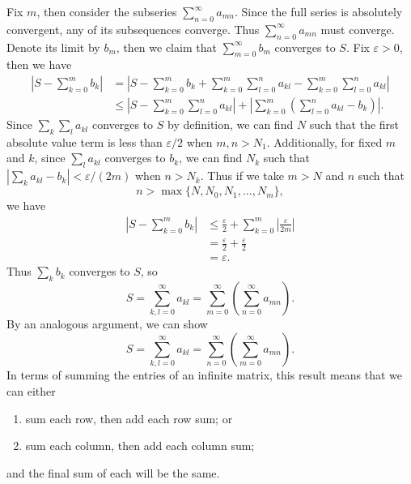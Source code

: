 \documentclass[10pt]{amsart}
\begin{document}
Fix $m$, then consider the subseries $\sum_{n=0}^{\infty} a_{mn}$. Since the full series is absolutely convergent, any of its subsequences converge. Thus $\sum_{n=0}^{\infty} a_{mn}$ must converge. Denote its limit by $b_m$, then we claim that $\sum_{m=0}^{\infty} b_m$ converges to $S$. Fix $\varepsilon>0$, then we have
\begin{align*}
	\left|S-\sum_{k=0}^{m} b_k\right| &= \left| S - \sum_{k=0}^{m} b_k + \sum_{k=0}^{m} \sum_{l=0}^{n} a_{kl} - \sum_{k=0}^{m} \sum_{l=0}^{n} a_{kl} \right| \\
					  &\leq \left| S - \sum_{k=0}^{m} \sum_{l=0}^{n} a_{kl} \right| + \left| \sum_{k=0}^{m} \left( \sum_{l=0}^{n} a_{kl} - b_k \right) \right|.
\end{align*}
Since $\sum_k \sum_l a_{kl}$ converges to $S$ by definition, we can find $N$ such that the first absolute value term is less than $\varepsilon/2$ when $m,n > N_1$. Additionally, for fixed $m$ and $k$, since $\sum_{l}a_{kl}$ converges to $b_k$, we can find $N_k$ such that $| \sum_k a_{kl} - b_k | < \varepsilon/(2m)$ when $n > N_k$. Thus if we take $m> N$ and $n$ such that
\[
	n > \max\{ N, N_0, N_1,\dots, N_m \},
\] we have
\begin{align*}
	\left|S-\sum_{k=0}^{m} b_k\right| &\leq \frac{\varepsilon}{2} + \sum_{k=0}^{m} \left| \frac{\varepsilon}{2m}  \right| \\
					  &= \frac{\varepsilon}{2} + \frac{\varepsilon}{2} \\
					  &= \varepsilon.
\end{align*}
Thus $\sum_k b_k$ converges to $S$, so
\[
	S = \sum_{k,l=0}^{\infty} a_{kl} = \sum_{m=0}^{\infty} \left( \sum_{n=0}^{\infty} a_{mn} \right).
\] By an analogous argument, we can show
\[
	S = \sum_{k,l=0}^{\infty} a_{kl} = \sum_{n=0}^{\infty} \left( \sum_{m=0}^{\infty} a_{mn} \right).
\] In terms of summing the entries of an infinite matrix, this result means that we can either
\begin{enumerate}
	\item sum each row, then add each row sum; or
	\item sum each column, then add each column sum;
\end{enumerate}
and the final sum of each will be the same.
\end{document}
